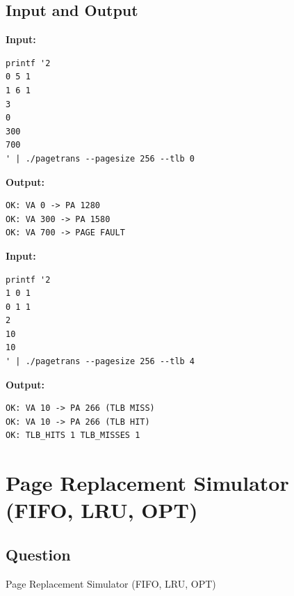 \documentclass[12pt,a4paper]{article}
\begin{document}
\subsection{Input and Output}
\noindent\textbf{Input:}
\begin{verbatim}
printf '2
0 5 1
1 6 1
3
0
300
700
' | ./pagetrans --pagesize 256 --tlb 0
\end{verbatim}
\vspace{0.5cm}
\noindent\textbf{Output:}
\begin{verbatim}
OK: VA 0 -> PA 1280
OK: VA 300 -> PA 1580
OK: VA 700 -> PAGE FAULT
\end{verbatim}
\noindent\textbf{Input:}
\begin{verbatim}
printf '2
1 0 1
0 1 1
2
10
10
' | ./pagetrans --pagesize 256 --tlb 4
\end{verbatim}
\vspace{0.5cm}
\noindent\textbf{Output:}
\begin{verbatim}
OK: VA 10 -> PA 266 (TLB MISS)
OK: VA 10 -> PA 266 (TLB HIT)
OK: TLB_HITS 1 TLB_MISSES 1
\end{verbatim}
\newpage
\newpage
\section{Page Replacement Simulator (FIFO, LRU, OPT)}
\subsection{Question}
Page Replacement Simulator (FIFO, LRU, OPT)
\end{document}
